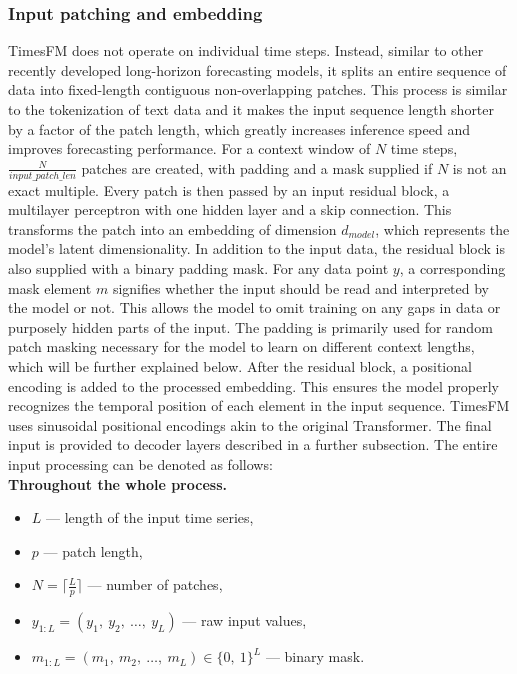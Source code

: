 \subsubsection{Input patching and embedding}

TimesFM does not operate on individual time steps. Instead, similar to other recently developed long-horizon forecasting models,  it splits an entire sequence of data into fixed-length contiguous non-overlapping patches. This process is similar to the tokenization of text data and it makes the input sequence length shorter by a factor of the patch length, which greatly increases inference speed and improves forecasting performance. 
For a context window of $ N $ time steps, $ \frac{N}{\mathit{input\_patch\_len}}$ patches are created, with padding and a mask supplied if $ N $ is not an exact multiple. Every patch is then passed by an input residual block, a multilayer perceptron with one hidden layer and a skip connection. This transforms the patch into an embedding of dimension $ \mathit{d_{model}} $, which represents the model's latent dimensionality. In addition to the input data, the residual block is also supplied with a binary padding mask. For any data point $ y $, a corresponding mask element $ m $ signifies whether the input should be read and interpreted by the model or not. This allows the model to omit training on any gaps in data or purposely hidden parts of the input. The padding is primarily used for random patch masking necessary for the model to learn on different context lengths, which will be further explained below. After the residual block, a positional encoding is added to the processed embedding. This ensures the model properly recognizes the temporal position of each element in the input sequence. TimesFM uses sinusoidal positional encodings akin to the original Transformer. The final input is provided to decoder layers described in a further subsection.
The entire input processing can be denoted as follows:
\\\textbf{Throughout the whole process.}
\begin{itemize}
    \item $ L $ --- length of the input time series,
    \item $ p $ --- patch length,
    \item $ N = \lceil\frac{L}{p}\rceil$ --- number of patches,
    \item $ y_{1:L} = (y_1,\ y_2,\ \ldots,\ y_L)$ --- raw input values,
    \item $ m_{1:L} = \left( m_1,\ m_2,\ \ldots,\ m_L \right) \in \{0,\ 1\}^L $ --- binary mask.
\end{itemize}
